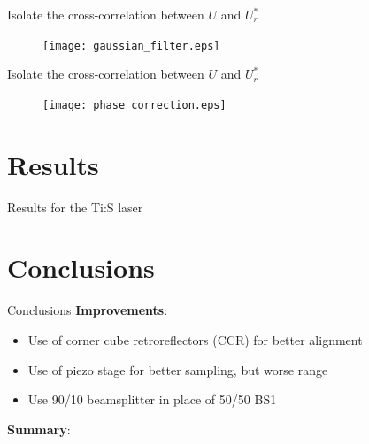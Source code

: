 \documentclass[11pt]{beamer}
\begin{document}
\begin{frame}
\vspace{20pt}
Isolate the cross-correlation between $U$ and $U_r^*$
\vspace{-15pt}
\begin{figure}
	\texttt{[image: gaussian\_filter.eps]}
\end{figure}
\end{frame}

\begin{frame}
\vspace{20pt}
Isolate the cross-correlation between $U$ and $U_r^*$
\vspace{-15pt}
\begin{figure}
	\texttt{[image: phase\_correction.eps]}
\end{figure}
\end{frame}

\section{Results}
\begin{frame}{Results for the Ti:S laser}

\end{frame}
\section{Conclusions}
\begin{frame}{Conclusions}
\textbf{Improvements}:\\
	\begin{itemize}
		\item Use of corner cube retroreflectors (CCR) for better alignment
		\item Use of piezo stage for better sampling, but worse range
		\item Use 90/10 beamsplitter in place of 50/50 BS1
	\end{itemize}
	
	\vspace{5pt}
\textbf{Summary}:\\
	
\end{frame}
\end{document}
